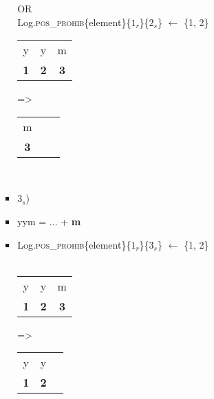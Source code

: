\documentclass{article}
\begin{document}
\begin{itemize}
\begin{itemize}
\begin{enumerate}
\begin{itemize}
                OR \\
                Log.\textsc{pos\_prohib}\{element\}\{\textsc{$1_r$}\}\{\textsc{$2_s$}\} $\leftarrow$ \{1, 2\}
                \\
                
                \begin{tabular}{ |c|c|c| } 
                 \hline
                 y & y & m \\ 
                 \textbf{1} & \textbf{2} & \textbf{3} \\ 
                 \hline
                \end{tabular}
                =\textgreater~
               \begin{tabular}{ |c|c|c| } 
                 \hline
                 m \\ 
                 \textbf{3} \\ 
                 \hline
                \end{tabular}
                \\
                \item $3_s$)
                \item yym = ... + \textbf{m}
                \item  Log.\textsc{pos\_prohib}\{element\}\{\textsc{$1_r$}\}\{\textsc{$3_s$}\} $\leftarrow$ \{1, 2\}
                \\ ~~~
                \begin{tabular}{ |c|c|c| } 
                 \hline
                 y & y & m \\ 
                 \textbf{1} & \textbf{2} & \textbf{3} \\ 
                 \hline
                \end{tabular}
                =\textgreater~
                \begin{tabular}{ |c|c|c| } 
                 \hline
                 y & y \\ 
                 \textbf{1} & \textbf{2} \\ 
                 \hline
                \end{tabular}
                

\end{itemize}
\end{enumerate}
\end{itemize}
\end{itemize}
\end{document}
